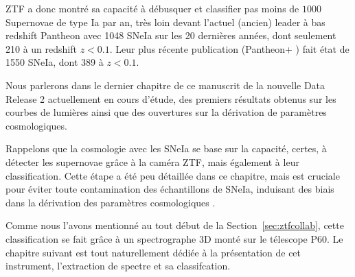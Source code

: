 \documentclass[../main/main.tex]{subfiles}
\begin{document}
ZTF a donc montré sa capacité à débusquer et classifier pas moins de
$1000$ Supernovae de type Ia par an, très loin devant l'actuel (ancien)
leader à bas redshift Pantheon \citep{Scolnicpantheon18} avec 1048 SNeIa
sur les 20 dernières années, dont seulement 210 à un redshift
$z<0.1$. Leur plus récente publication (Pantheon+
\citet{Scolnicpantheon21}) fait état de 1550 SNeIa, dont 389 à $z<0.1$.

Nous parlerons dans le dernier chapitre de ce manuscrit de la nouvelle
Data Release 2 actuellement en cours d'étude, des premiers résultats obtenus sur les courbes de
lumières ainsi que des ouvertures sur la dérivation de paramètres
cosmologiques.

Rappelons que la cosmologie avec les SNeIa se base sur la capacité, certes, à
détecter les supernovae grâce à la caméra ZTF, mais également à leur
classification. Cette étape a été peu détaillée dans ce chapitre, mais
est cruciale pour éviter toute contamination des échantillons de SNeIa,
induisant des biais dans la dérivation des paramètres cosmologiques
\citep{JonesScolnic17SNcontam}.

Comme nous l'avons mentionné au tout
début de la Section~\ref{sec:ztfcollab}, cette classification se fait
grâce à un spectrographe 3D monté sur le télescope P60. Le chapitre
suivant est tout naturellement dédiée à la présentation de cet
instrument, l'extraction de spectre et sa classifcation.


%
%
\end{document}

